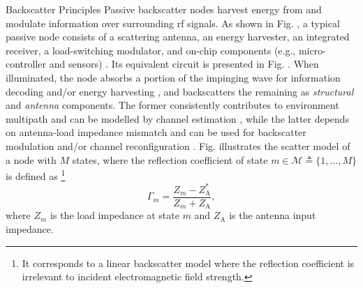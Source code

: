 \documentclass[journal]{IEEEtran}
\begin{document}
\begin{section}{Backscatter Principles}
	Passive backscatter nodes harvest energy from and modulate information over surrounding \gls{rf} signals.
	As shown in Fig. , a typical passive node consists of a scattering antenna, an energy harvester, an integrated receiver, a load-switching modulator, and on-chip components (e.g., micro-controller and sensors) \cite{Dobkin2012}.
	Its equivalent circuit is presented in Fig. .
	When illuminated, the node absorbs a portion of the impinging wave for information decoding and/or energy harvesting \cite{Kim2021a}, and backscatters the remaining as \emph{structural} and \emph{antenna} components.
	The former consistently contributes to environment multipath and can be modelled by channel estimation \cite{Boyer2014}, while the latter depends on antenna-load impedance mismatch and can be used for backscatter modulation \cite{Boyer2012} and/or channel reconfiguration \cite{Wu2021b}.
	Fig.  illustrates the scatter model of a node with $M$ states, where the reflection coefficient of state $m \in \mathcal{M} \triangleq \{1,\ldots,M\}$ is defined as%
	\footnote{It corresponds to a linear backscatter model where the reflection coefficient is irrelevant to incident electromagnetic field strength.}
	\begin{equation}
		\Gamma_m = \frac{Z_m - Z_{\mathrm{A}}^*}{Z_m + Z_{\mathrm{A}}},
		\label{eq:reflection_coefficient}
	\end{equation}
	where $Z_m$ is the load impedance at state $m$ and $Z_{\mathrm{A}}$ is the antenna input impedance.


\end{section}
\end{document}
